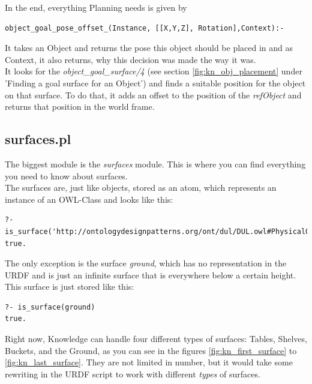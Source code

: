 \documentclass[main.tex]{subfiles}
\begin{document}
In the end, everything Planning needs is given by
\begin{lstlisting}
object_goal_pose_offset_(Instance, [[X,Y,Z], Rotation],Context):-
\end{lstlisting}
It takes an Object and returns the pose this object should be placed in and as Context, it also returns, why this decision was made the way it was.\\
It looks for the \textit{object\_goal\_surface/4} (see section \ref{fig:kn_obj_placement} under 'Finding a goal surface for an Object') and finds a suitable position for the object on that surface. To do that, it adds an offset to the position of the \textit{refObject} and returns that position in the world frame.

\subsection{surfaces.pl}

The biggest module is the \textit{surfaces} module. This is where you can find everything you need to know about surfaces.\\
The surfaces are, just like objects, stored as an atom, which represents an instance of an OWL-Class and looks like this:
\begin{lstlisting}
?- is_surface('http://ontologydesignpatterns.org/ont/dul/DUL.owl#PhysicalObject_UHOJSVEC')
true.
\end{lstlisting}
The only exception is the surface \textit{ground}, which has no representation in the URDF and is just an infinite surface that is everywhere below a certain height. This surface is just stored like this:
\begin{lstlisting}
?- is_surface(ground)
true.
\end{lstlisting}

Right now, Knowledge can handle four different types of surfaces: Tables, Shelves, Buckets, and the Ground, as you can see in the figures \ref{fig:kn_first_surface} to \ref{fig:kn_last_surface}. They are not limited in number, but it would take some rewriting in the URDF script to work with different \textit{types} of surfaces.
\end{document}
